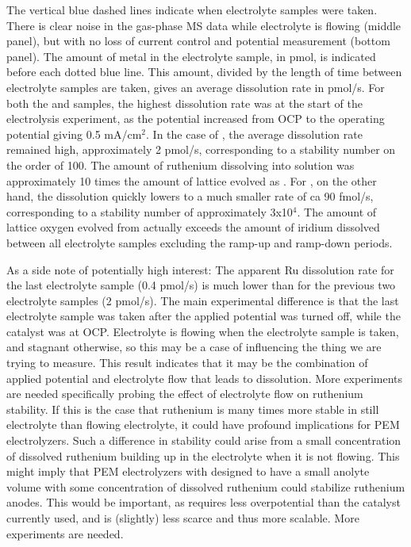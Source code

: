 The vertical blue dashed lines indicate when electrolyte samples were taken. There is clear noise in the gas-phase MS data while electrolyte is flowing (middle panel), but with no loss of current control and potential measurement (bottom panel). The amount of metal in the electrolyte sample, in pmol, is indicated before each dotted blue line. This amount, divided by the length of time between electrolyte samples are taken, gives an average dissolution rate in pmol/s. For both the  and  samples, the highest dissolution rate was at the start of the electrolysis experiment, as the potential increased from OCP to the operating potential giving 0.5 mA/cm$^2$. In the case of , the average dissolution rate remained high, approximately 2 pmol/s, corresponding to a stability number on the order of 100. The amount of ruthenium dissolving into solution was approximately 10 times the amount of lattice  evolved as . For , on the other hand, the dissolution quickly lowers to a much smaller rate of ca 90 fmol/s, corresponding to a stability number of approximately 3x10$^4$. The amount of lattice oxygen evolved from  actually exceeds the amount of iridium dissolved between all electrolyte samples excluding the ramp-up and ramp-down periods.

As a side note of potentially high interest: The apparent Ru dissolution rate for the last electrolyte sample (0.4 pmol/s) is much lower than for the previous two electrolyte samples (2 pmol/s). The main experimental difference is that the last electrolyte sample was taken after the applied potential was turned off, while the catalyst was at OCP. Electrolyte is flowing when the electrolyte sample is taken, and stagnant otherwise, so this may be a case of influencing the thing we are trying to measure. This result indicates that it may be the combination of applied potential and electrolyte flow that leads to  dissolution. More experiments are needed specifically probing the effect of electrolyte flow on ruthenium stability. If this is the case that ruthenium is many times more stable in still electrolyte than flowing electrolyte, it could have profound implications for PEM electrolyzers. Such a difference in stability could arise from a small concentration of dissolved ruthenium building up in the electrolyte when it is not flowing. This might imply that PEM electrolyzers with  designed to have a small anolyte volume with some concentration of dissolved ruthenium could stabilize ruthenium anodes. This would be important, as  requires less overpotential than the  catalyst currently used, and is (slightly) less scarce and thus more scalable. More experiments are needed.


